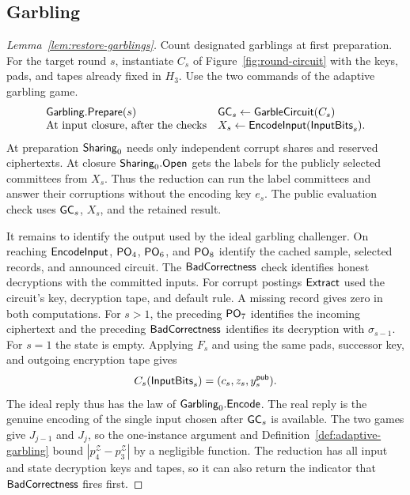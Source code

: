 \subsection{Garbling}
\label{sec:garbling-hybrid-proof}
\begin{proof}[Lemma~\ref{lem:restore-garblings}]
Count designated garblings at first preparation. For the target round
$s$, instantiate $C_s$ of Figure~\ref{fig:round-circuit} with the keys,
pads, and tapes already fixed in $H_3$. Use the two commands of the
adaptive garbling game.
\[
 \begin{array}{@{}ll@{}}
  \Garbling.\Prepare(s) & \GC_s\gets\GarbleCircuit(C_s)\\
  \text{At input closure, after the checks} &
      X_s\gets\EncodeInput(\InputBits_s).
 \end{array}
\]
At preparation $\mathsf{Sharing}_0$ needs only independent corrupt shares and
reserved ciphertexts. At closure $\mathsf{Sharing}_0.\mathsf{Open}$ gets the labels for
the publicly selected committees from $X_s$. Thus the reduction can run the label committees and
answer their corruptions without the encoding key $e_s$. The public
evaluation check uses $\mathsf{GC}_s$, $X_s$, and the retained result.

It remains to identify the output used by the ideal garbling challenger.
On reaching $\mathsf{EncodeInput}$, $\mathsf{PO}_{4}$, $\mathsf{PO}_{6}$, and $\mathsf{PO}_{8}$ identify
the cached sample, selected records, and announced circuit. The
$\mathsf{BadCorrectness}$ check identifies honest decryptions with the committed
inputs. For corrupt postings $\mathsf{Extract}$ used the circuit's key,
decryption tape, and default rule. A missing record gives zero in both
computations. For $s>1$, the preceding $\mathsf{PO}_{7}$ identifies the incoming
ciphertext and the preceding $\mathsf{BadCorrectness}$ identifies its decryption
with $\sigma_{s-1}$. For $s=1$ the state is empty. Applying $F_s$ and
using the same pads, successor key, and outgoing encryption tape gives
\begin{equation}
 C_s(\mathsf{InputBits}_s)=(c_s,z_s,y^{\mathsf{pub}}_s).
 \label{eq:round-output-at-closure}
\end{equation}
The ideal reply thus has the law of $\mathsf{Garbling}_0.\mathsf{Encode}$.
The real reply is the genuine encoding of the single input chosen
after $\mathsf{GC}_s$ is available. The two games give $J_{j-1}$ and $J_j$,
so the one-instance argument and Definition~\ref{def:adaptive-garbling}
bound $|p_4^{\mathcal Z}-p_3^{\mathcal Z}|$ by a negligible function.
The reduction has all input and state decryption keys and tapes, so it
can also return the indicator that $\mathsf{BadCorrectness}$ fires first.
\end{proof}

